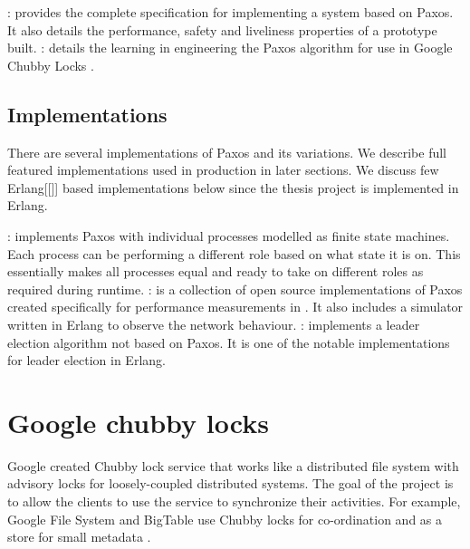 \begin{itemize}
    : \citet{Kirsch08paxosfor} provides the
    complete specification for implementing a system based on Paxos. It also
    details the performance, safety and liveliness properties of a prototype
    built.
    : \cite{ChandraGR07}
    details the learning in engineering the Paxos algorithm for use in
    Google Chubby Locks \citep{Burrows06}.
\end{itemize}

\subsection{Implementations}

There are several implementations of Paxos and its variations. We describe full
featured implementations used in production in later sections. We discuss few
Erlang[[]] based implementations below since the thesis project is implemented
in Erlang.

\begin{itemize}
    : \citep{Uenishi2012} implements Paxos with
    individual processes modelled as finite state machines. Each process can
    be performing a different role based on what state it is on. This 
    essentially makes all processes equal and ready to take on different roles
    as required during runtime.
    : \citet{Lugano2012} is a collection of open source 
    implementations of Paxos created specifically for performance measurements
    in \citet{MarandiPSP10}. It also includes a simulator written in Erlang to
    observe the network behaviour.
    : \citet{Ulf2012} implements a leader election algorithm
    not based on Paxos. It is one of the notable implementations for leader
    election in Erlang.
\end{itemize}

\section{Google chubby locks}
\label{section:chubby.locks}

Google created Chubby lock service \citep{Burrows06} that works like a 
distributed file system with advisory locks for loosely-coupled distributed 
systems. The goal of the project is to allow the clients to use the service
to synchronize their activities. For example, Google File System \citep{gfs} 
and BigTable \citep{ChangDGHWBCFG06} use Chubby locks for co-ordination and
as a store for small metadata \citep{ChandraGR07}.

